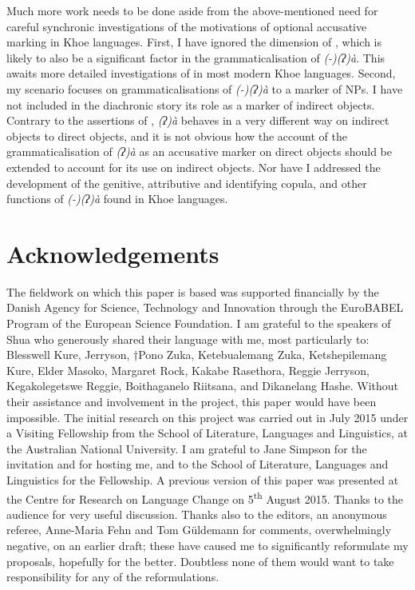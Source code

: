 \documentclass[output=paper]{LSP/langsci}
\begin{document}
\newpage 
Much more work needs to be done aside from the above-mentioned need for careful synchronic investigations of the motivations of optional accusative marking in Khoe languages. First, I have ignored the dimension of , which is likely to also be a significant factor in the grammaticalisation of \textit{(-)(ʔ)à}. This awaits more detailed investigations of  in most modern Khoe languages. Second, my scenario focuses on grammaticalisations of \textit{(-)(ʔ)à} to a marker of  NPs. I have not included in the diachronic story its role as a marker of indirect objects. Contrary to the assertions of \citet[373]{Kilian-Hatz2013Kxoe}, \textit{(ʔ)à} behaves in a very different way on indirect objects to direct objects, and it is not obvious how the account of the grammaticalisation of \textit{(ʔ)à} as an accusative marker on direct objects should be extended to account for its use on indirect objects. Nor have I addressed the development of the genitive, attributive and identifying copula, and other functions of \textit{(-)(ʔ)à} found in Khoe languages.

\section*{Acknowledgements}
The fieldwork on which this paper is based was supported financially by the Danish Agency for Science, Technology and Innovation through the EuroBABEL Program of the European Science Foundation. I am grateful to the speakers of Shua who generously shared their language with me, most particularly to: Blesswell Kure, Jerryson, †Pono Zuka, Ketebualemang Zuka, Ketshepilemang Kure, Elder Masoko, Margaret Rock, Kakabe Rasethora, Reggie Jerryson, Kegakolegetswe Reggie, Boithaganelo Riitsana, and Dikanelang Hashe. Without their assistance and involvement in the project, this paper would have been impossible. The initial research on this project was carried out in July 2015 under a Visiting Fellowship from the School of Literature, Languages and Linguistics, at the Australian National University. I am grateful to Jane Simpson for the invitation and for hosting me, and to the School of Literature, Languages and Linguistics for the Fellowship. A previous version of this paper was presented at the Centre for Research on Language Change on 5\textsuperscript{th} August 2015. Thanks to the audience for very useful discussion. Thanks also to the editors, an anonymous referee, Anne-Maria Fehn and Tom Güldemann for comments, overwhelmingly negative, on an earlier draft; these have caused me to significantly reformulate my proposals, hopefully for the better. Doubtless none of them would want to take responsibility for any of the reformulations.
\end{document}
